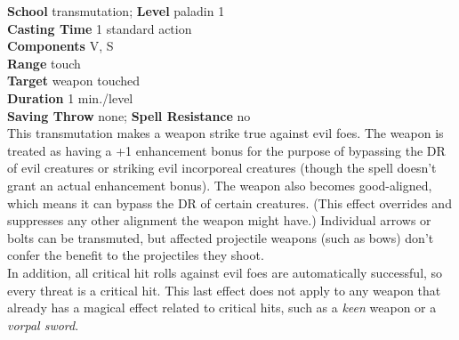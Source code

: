 \textbf{School} transmutation; \textbf{Level} paladin 1\\
\textbf{Casting Time} 1 standard action\\
\textbf{Components} V, S\\
\textbf{Range} touch\\
\textbf{Target }weapon touched\\
\textbf{Duration} 1 min./level\\
\textbf{Saving Throw} none; \textbf{Spell Resistance} no\\
This transmutation makes a weapon strike true against evil foes. The weapon is treated as having a +1 enhancement bonus for the purpose of bypassing the DR of evil creatures or striking evil incorporeal creatures (though the spell doesn't grant an actual enhancement bonus). The weapon also becomes good-aligned, which means it can bypass the DR of certain creatures. (This effect overrides and suppresses any other alignment the weapon might have.) Individual arrows or bolts can be transmuted, but affected projectile weapons (such as bows) don't confer the benefit to the projectiles they shoot.\\
In addition, all critical hit rolls against evil foes are automatically successful, so every threat is a critical hit. This last effect does not apply to any weapon that already has a magical effect related to critical hits, such as a \textit{keen} weapon or a \textit{vorpal sword}.\\
